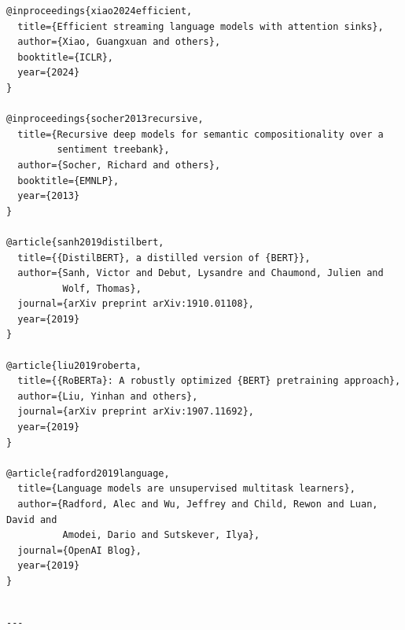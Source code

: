 \begin{lstlisting}
@inproceedings{xiao2024efficient,
  title={Efficient streaming language models with attention sinks},
  author={Xiao, Guangxuan and others},
  booktitle={ICLR},
  year={2024}
}

@inproceedings{socher2013recursive,
  title={Recursive deep models for semantic compositionality over a 
         sentiment treebank},
  author={Socher, Richard and others},
  booktitle={EMNLP},
  year={2013}
}

@article{sanh2019distilbert,
  title={{DistilBERT}, a distilled version of {BERT}},
  author={Sanh, Victor and Debut, Lysandre and Chaumond, Julien and 
          Wolf, Thomas},
  journal={arXiv preprint arXiv:1910.01108},
  year={2019}
}

@article{liu2019roberta,
  title={{RoBERTa}: A robustly optimized {BERT} pretraining approach},
  author={Liu, Yinhan and others},
  journal={arXiv preprint arXiv:1907.11692},
  year={2019}
}

@article{radford2019language,
  title={Language models are unsupervised multitask learners},
  author={Radford, Alec and Wu, Jeffrey and Child, Rewon and Luan, David and 
          Amodei, Dario and Sutskever, Ilya},
  journal={OpenAI Blog},
  year={2019}
}
\end{lstlisting}
\begin{lstlisting}

---
\end{lstlisting}